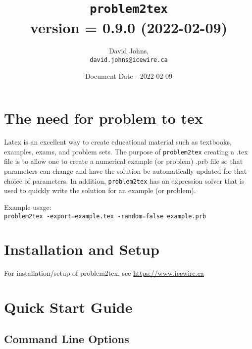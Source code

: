 \documentclass{article}
\title{\color{blue}\texttt{problem2tex} \\ \normalsize{version = 0.9.0 (2022-02-09)}}
\author{
David Johns, \\ \texttt{david.johns@icewire.ca}
}
\date{Document Date - 2022-02-09}
\begin{document}
\maketitle
\tableofcontents

\section{The need for problem to tex}


Latex is an excellent way to create educational material such as textbooks, examples, exams, and problem sets.  The purpose of \texttt{problem2tex} creating a .tex file is to allow one to create a numerical example (or problem) .prb file so that parameters can change and have the solution be automatically updated for that choice of parameters.  In addition, \texttt{problem2tex} has an expression solver that is used to quickly write the solution for an example (or problem).  

Example usage:\\
\texttt{problem2tex -export=example.tex -random=false example.prb}

\section{Installation and Setup}

For installation/setup of problem2tex, see \href{https://www.icewire.ca}{https://www.icewire.ca}




\section{Quick Start Guide}

\subsection{Command Line Options}
\end{document}
